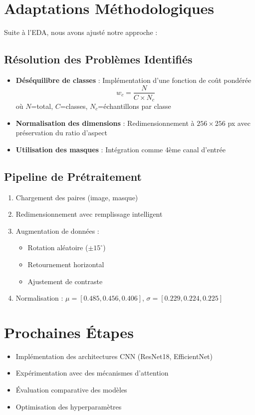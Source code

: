 \documentclass[a4paper,12pt]{article}
\begin{document}
\section{Adaptations Méthodologiques}
Suite à l'EDA, nous avons ajusté notre approche :

\subsection{Résolution des Problèmes Identifiés}
\begin{itemize}
    \item \textbf{Déséquilibre de classes} : Implémentation d'une fonction de coût pondérée
    \begin{equation}
        w_c = \frac{N}{C \times N_c}
    \end{equation}
    où $N$=total, $C$=classes, $N_c$=échantillons par classe

    \item \textbf{Normalisation des dimensions} : Redimensionnement à $256\times256$ px avec préservation du ratio d'aspect

    \item \textbf{Utilisation des masques} : Intégration comme 4ème canal d'entrée
\end{itemize}

\subsection{Pipeline de Prétraitement}
\begin{enumerate}
    \item Chargement des paires (image, masque)
    \item Redimensionnement avec remplissage intelligent
    \item Augmentation de données :
    \begin{itemize}
        \item Rotation aléatoire ($\pm15^\circ$)
        \item Retournement horizontal
        \item Ajustement de contraste
    \end{itemize}
    \item Normalisation : $\mu=[0.485,0.456,0.406]$, $\sigma=[0.229,0.224,0.225]$
\end{enumerate}

\section{Prochaines Étapes}
\begin{itemize}
    \item Implémentation des architectures CNN (ResNet18, EfficientNet)
    \item Expérimentation avec des mécanismes d'attention
    \item Évaluation comparative des modèles
    \item Optimisation des hyperparamètres
\end{itemize}
\end{document}
